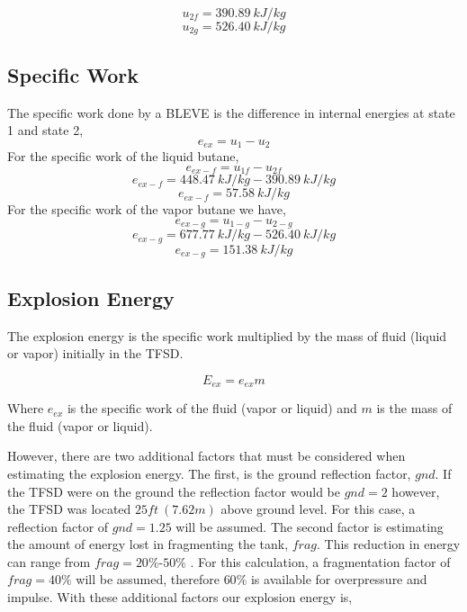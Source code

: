 \documentclass[10pt,parskip=half,
toc=sectionentrywithdots,
bibliography=totocnumbered,
captions=tableheading,numbers=noendperiod]{scrartcl}
\begin{document}
\begin{equation}u_{2f} = 390.89\:kJ/kg\end{equation}
\begin{equation}u_{2g} = 526.40\:kJ/kg\end{equation}

\hypertarget{specific-work}{%
\subsection{Specific Work}\label{specific-work}}

The specific work done by a BLEVE is the difference in internal energies
at state 1 and state 2, \begin{equation}e_{ex}=u_1-u_2\end{equation} For
the specific work of the liquid butane,
\begin{equation}e_{ex-f} = u_{1f} - u_{2f}\end{equation}
\begin{equation}e_{ex-f} = 448.47\:kJ/kg - 390.89\:kJ/kg\end{equation}
\begin{equation}e_{ex-f} = 57.58\:kJ/kg\end{equation} For the specific
work of the vapor butane we have,
\begin{equation}e_{ex-g} = u_{1-g} - u_{2-g}\end{equation}
\begin{equation}e_{ex-g} = 677.77\:kJ/kg - 526.40\:kJ/kg\end{equation}
\begin{equation}e_{ex-g} = 151.38\:kJ/kg\end{equation}

\hypertarget{explosion-energy}{%
\subsection{Explosion Energy}\label{explosion-energy}}

The explosion energy is the specific work multiplied by the mass of
fluid (liquid or vapor) initially in the TFSD.

\begin{equation}E_{ex}=e_{ex}m\end{equation}

Where \(e_{ex}\) is the specific work of the fluid (vapor or liquid) and
\(m\) is the mass of the fluid (vapor or liquid).

However, there are two additional factors that must be considered when
estimating the explosion energy. The first, is the ground reflection
factor, \(gnd\). If the TFSD were on the ground the reflection factor
would be \(gnd=2\) however, the TFSD was located \(25ft\:(7.62m)\) above
ground level. For this case, a reflection factor of \(gnd=1.25\) will be
assumed. The second factor is estimating the amount of energy lost in
fragmenting the tank, \(frag\). This reduction in energy can range from
\(frag = 20\%\)-\(50\%\) \cite{Safety2010}. For this calculation, a
fragmentation factor of \(frag=40\%\) will be assumed, therefore
\(60\%\) is available for overpressure and impulse. With these
additional factors our explosion energy is,
\end{document}
